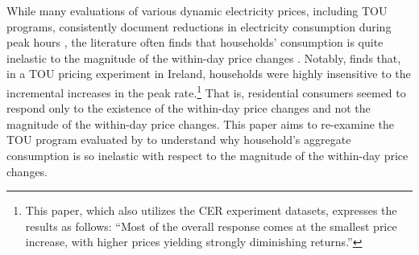 While many evaluations of various dynamic electricity prices, including TOU programs, consistently document reductions in electricity consumption during peak hours \citep{Quantifying-Customer-Response-to-Dynamic-Pricing_Faruqui-and-George_2005, Dynamic-Pricing-of-Electricity-in-the-Mid-Atlantic-Region_Econometric-Results-from-the-Baltimore-Gas-and-Electric-Company-Experiment_Faruqui-et-al_2011, Dynamic-Pricing-of-Electricity-for-Residential-Customers_The-Evidence-from-Michigan_Faruqui-et-al_2013}, the literature often finds that households' consumption is quite inelastic to the magnitude of the within-day price changes \citep{Rethinking-Real-Time-Electricity-Pricing_Allcott_2011, Knowledge-is-Less-Power_Jessoe-and-Rapson_2014}. Notably, \cite{Peaking-Interest:How-Awareness-Drives-the-Effectiveness-of-Time-of-Use-Electricity-Pricing_Prest_2020} finds that, in a TOU pricing experiment in Ireland, households were highly insensitive to the incremental increases in the peak rate.\footnote{This paper, which also utilizes the CER experiment datasets, expresses the results as follows: ``Most of the overall response comes at the smallest price increase, with higher prices yielding strongly diminishing returns.''} That is, residential consumers seemed to respond only to the existence of the within-day price changes and not the magnitude of the within-day price changes. This paper aims to re-examine the TOU program evaluated by \cite{Peaking-Interest:How-Awareness-Drives-the-Effectiveness-of-Time-of-Use-Electricity-Pricing_Prest_2020} to understand why household's aggregate consumption is so inelastic with respect to the magnitude of the within-day price changes. 

